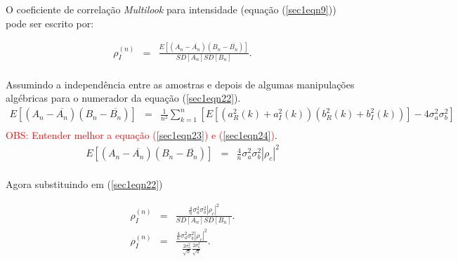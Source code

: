 \documentclass[12pt,a4paper]{article}
\begin{document}
O coeficiente de correlação {\it Multilook} para intensidade (equação (\ref{sec1eqn9})) pode ser escrito por:

\begin{equation}\label{sec1eqn22}
\begin{array}{ccc}
	\rho_I^{(n)}&=&\frac{E[(A_n-\overline{A_n})(B_n-\overline{B_n})]}{SD[A_n]SD[B_n]}. \\
\end{array}
\end{equation}

Assumindo a independência entre as amostras e depois de algumas manipulações algébricas para o numerador da equação (\ref{sec1eqn22}). 
\begin{equation}\label{sec1eqn23}
\begin{array}{ccc}
	E[(A_n-\overline{A_n})(B_n-\overline{B_n})]&=&\frac{1}{n^2}{\displaystyle{\sum_{k=1}^{n}[E[(a_{R}^2(k)+a_{I}^2(k))(b_{R}^2(k)+b_{I}^2(k))]-4\sigma_a^2\sigma_b^2] }}\\
\end{array}
\end{equation}
\textcolor{red}{OBS: Entender melhor a equação (\ref{sec1eqn23}) e (\ref{sec1eqn24})}.
\begin{equation}\label{sec1eqn24}
\begin{array}{ccc}
	E[(A_n-\overline{A_n})(B_n-\overline{B_n})]&=&\frac{4}{n}\sigma_a^2\sigma_b^2\left|\rho_c\right|^2\\
\end{array}
\end{equation}

Agora substituindo em (\ref{sec1eqn22})

\begin{equation}\label{sec1eqn25}
\begin{array}{ccc}
	\rho_I^{(n)}&=&\frac{\frac{4}{n}\sigma_a^2\sigma_b^2\left|\rho_c\right|^2}{SD[A_n]SD[B_n]}. \\
	\rho_I^{(n)}&=&\frac{\frac{4}{n}\sigma_a^2\sigma_b^2\left|\rho_c\right|^2}{\frac{2\sigma_a^2}{\sqrt{n}}\frac{2\sigma_b^2}{\sqrt{n}}}. \\
\end{array}
\end{equation}
\end{document}
